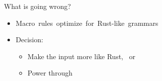 \documentclass[usepdftitle=false,aspectratio=169]{beamer}
\begin{document}

\begin{frame}[fragile]{What is going wrong?}
  \begin{itemize}[label=\footnotesize{},labelsep=10pt]
  \item \mbox{Macro rules optimize for Rust-like grammars\hspace*{-1000pt}}
  \vspace{4pt}
  \item Decision:
    \begin{itemize}[label=$\circ$,labelsep=10pt]
    \vspace{-4pt}
    \item Make the input more like Rust, \ or
    \vspace{-4pt}
    \item Power through
    \end{itemize}
  \end{itemize} 
\end{frame}
\end{document}
